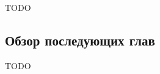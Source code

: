 \documentclass[../diploma.tex]{subfiles}
\begin{document}
 \label{sec:introduction}

TODO

\subsection*{Обзор последующих глав}

TODO
\end{document}
